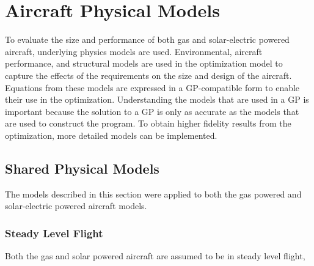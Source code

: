 
\section{Aircraft Physical Models}

To evaluate the size and performance of both gas and solar-electric powered aircraft, underlying physics models are used.  
Environmental, aircraft performance, and structural models are used in the optimization model to capture the effects of the requirements on the size and design of the aircraft.
Equations from these models are expressed in a GP-compatible form to enable their use in the optimization. 
Understanding the models that are used in a GP is important because the solution to a GP is only as accurate as the models that are used to construct the program.  
To obtain higher fidelity results from the optimization, more detailed models can be implemented. 

\subsection{Shared Physical Models}

The models described in this section were applied to both the gas powered and solar-electric powered aircraft models. 

\subsubsection{Steady Level Flight}

Both the gas and solar powered aircraft are assumed to be in steady level flight,\cite{hoburgthesis}

